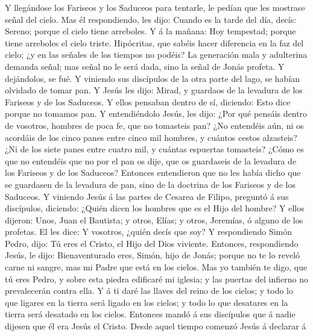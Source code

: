  Y llegándose los Fariseos y los Saduceos para tentarle,
le pedían que les mostrase señal del cielo.  Mas él
respondiendo, les dijo: Cuando es la tarde del día, decís: Sereno;
porque el cielo tiene arreboles.  Y á la mañana: Hoy
tempestad; porque tiene arreboles el cielo triste. Hipócritas, que
sabéis hacer diferencia en la faz del cielo; ¿y en las señales de los
tiempos no podéis?  La generación mala y adulterina
demanda señal; mas señal no le será dada, sino la señal de Jonás
profeta. Y dejándolos, se fué.  Y viniendo sus discípulos
de la otra parte del lago, se habían olvidado de tomar pan.
 Y Jesús les dijo: Mirad, y guardaos de la levadura de los
Fariseos y de los Saduceos.  Y ellos pensaban dentro de
sí, diciendo: Esto dice porque no tomamos pan.  Y
entendiéndolo Jesús, les dijo: ¿Por qué pensáis dentro de vosotros,
hombres de poca fe, que no tomasteis pan?  ¿No entendéis
aún, ni os acordáis de los cinco panes entre cinco mil hombres, y
cuántos cestos alzasteis?  ¿Ni de los siete panes entre
cuatro mil, y cuántas espuertas tomasteis?  ¿Cómo es que
no entendéis que no por el pan os dije, que os guardaseis de la levadura
de los Fariseos y de los Saduceos?  Entonces entendieron
que no les había dicho que se guardasen de la levadura de pan, sino de
la doctrina de los Fariseos y de los Saduceos.  Y
viniendo Jesús á las partes de Cesarea de Filipo, preguntó á sus
discípulos, diciendo: ¿Quién dicen los hombres que es el Hijo del
hombre?  Y ellos dijeron: Unos, Juan el Bautista; y
otros, Elías; y otros, Jeremías, ó alguno de los profetas.
 El les dice: Y vosotros, ¿quién decís que soy?
 Y respondiendo Simón Pedro, dijo: Tú eres el Cristo, el
Hijo del Dios viviente.  Entonces, respondiendo Jesús, le
dijo: Bienaventurado eres, Simón, hijo de Jonás; porque no te lo reveló
carne ni sangre, mas mi Padre que está en los cielos. 
Mas yo también te digo, que tú eres Pedro, y sobre esta piedra edificaré
mi iglesia; y las puertas del infierno no prevalecerán contra ella.
 Y á ti daré las llaves del reino de los cielos; y todo
lo que ligares en la tierra será ligado en los cielos; y todo lo que
desatares en la tierra será desatado en los cielos. 
Entonces mandó á sus discípulos que á nadie dijesen que él era Jesús el
Cristo.  Desde aquel tiempo comenzó Jesús á declarar á
